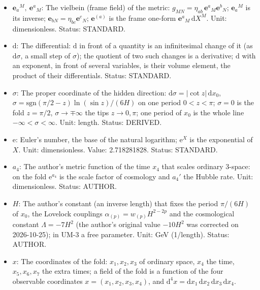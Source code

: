 \documentclass[
  10pt,
]{article}
\providecommand{\tightlist}{%
  \setlength{\itemsep}{0pt}\setlength{\parskip}{0pt}}
\begin{document}
\begin{itemize}
\tightlist
\item
  \(\mathbf{e}_a{}^M,\ \mathbf{e}^a{}_M\): The vielbein (frame field) of
  the metric: \(g_{MN} = \eta_{ab}\,\mathbf{e}^a{}_M\mathbf{e}^b{}_N\);
  \(\mathbf{e}_a{}^M\) is its inverse;
  \(\mathbf{e}_{bN} = \eta_{bc}\mathbf{e}^c{}_N\); \(\mathbf{e}^{(a)}\)
  is the frame one-form \(\mathbf{e}^a{}_M\,\mathrm{d}X^M\). Unit:
  dimensionless. Status: STANDARD.
\item
  \(\mathrm{d}\): The differential: \(\mathrm{d}\) in front of a
  quantity is an infinitesimal change of it (as \(\mathrm{d}\sigma\), a
  small step of \(\sigma\)); the quotient of two such changes is a
  derivative; \(\mathrm{d}\) with an exponent, in front of several
  variables, is their volume element, the product of their
  differentials. Status: STANDARD.
\item
  \(\sigma\): The proper coordinate of the hidden direction:
  \(\mathrm{d}\sigma = \lvert\cot z\rvert\,\mathrm{d}x_0\),
  \(\sigma = \mathrm{sgn}(\pi/2 - z)\ln(\sin z)/(6H)\) on one period
  \(0 < z < \pi\); \(\sigma = 0\) is the fold \(z = \pi/2\),
  \(\sigma \to \mp\infty\) the tips \(z \to 0, \pi\); one period of
  \(x_0\) is the whole line \(-\infty < \sigma < \infty\). Unit: length.
  Status: DERIVED.
\item
  \(\mathrm{e}\): Euler's number, the base of the natural logarithm;
  \(\mathrm{e}^{X}\) is the exponential of \(X\). Unit: dimensionless.
  Value: 2.718281828. Status: STANDARD.
\item
  \(a_4\): The author's metric function of the time \(x_4\) that scales
  ordinary 3-space: on the fold \(\mathrm{e}^{a_4}\) is the scale factor
  of cosmology and \(a_4'\) the Hubble rate. Unit: dimensionless.
  Status: AUTHOR.
\item
  \(H\): The author's constant (an inverse length) that fixes the period
  \(\pi/(6H)\) of \(x_0\), the Lovelock couplings
  \(\alpha_{(p)} = w_{(p)}H^{2-2p}\) and the cosmological constant
  \(\Lambda = -7H^2\) (the author's original value \(-10H^2\) was
  corrected on 2026-10-25); in UM-3 a free parameter. Unit: GeV
  (1/length). Status: AUTHOR.
\item
  \(x\): The coordinates of the fold: \(x_1, x_2, x_3\) of ordinary
  space, \(x_4\) the time, \(x_5, x_6, x_7\) the extra times; a field of
  the fold is a function of the four observable coordinates
  \(x = (x_1, x_2, x_3, x_4)\), and
  \(\mathrm{d}^4x = \mathrm{d}x_1\,\mathrm{d}x_2\,\mathrm{d}x_3\,\mathrm{d}x_4\).

\end{itemize}
\end{document}
